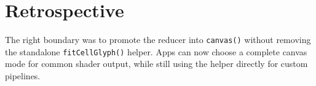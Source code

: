 \section{Retrospective}\label{record-162-retrospective}

The right boundary was to promote the reducer into \texttt{c\allowbreak{}a\allowbreak{}n\allowbreak{}v\allowbreak{}a\allowbreak{}s\allowbreak{}(\allowbreak{})} without removing the standalone \texttt{f\allowbreak{}i\allowbreak{}t\allowbreak{}C\allowbreak{}e\allowbreak{}l\allowbreak{}l\allowbreak{}G\allowbreak{}l\allowbreak{}y\allowbreak{}p\allowbreak{}h\allowbreak{}(\allowbreak{})} helper. Apps can now choose a complete canvas mode for common shader output, while still using the helper directly for custom pipelines.

